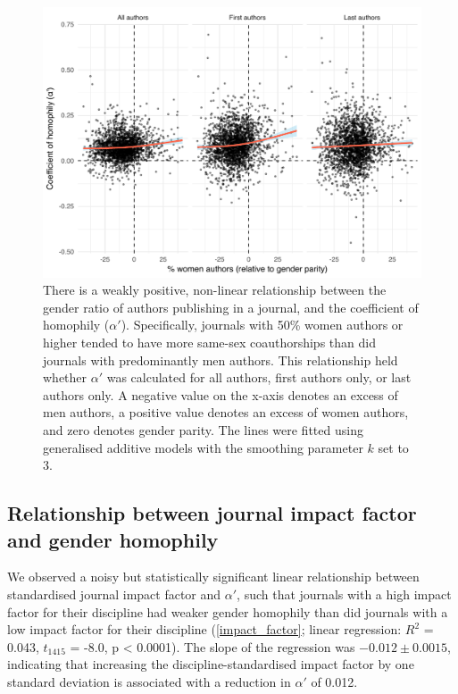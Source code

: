 \documentclass[12pt,]{article}
\begin{document}
\begin{figure}[htbp]
\centering
\includegraphics{../figures/Fig4.pdf}
\caption{There is a weakly positive, non-linear relationship between the
gender ratio of authors publishing in a journal, and the coefficient of
homophily (\(\alpha'\)). Specifically, journals with 50\% women authors
or higher tended to have more same-sex coauthorships than did journals
with predominantly men authors. This relationship held whether
\(\alpha'\) was calculated for all authors, first authors only, or last
authors only. A negative value on the x-axis denotes an excess of men
authors, a positive value denotes an excess of women authors, and zero
denotes gender parity. The lines were fitted using generalised additive
models with the smoothing parameter \(k\) set to 3.
\label{alpha_gender_ratio}}
\end{figure}

\subsection{Relationship between journal impact factor and gender
homophily}\label{relationship-between-journal-impact-factor-and-gender-homophily}

We observed a noisy but statistically significant linear relationship
between standardised journal impact factor and \(\alpha'\), such that
journals with a high impact factor for their discipline had weaker
gender homophily than did journals with a low impact factor for their
discipline (\autoref{impact_factor}; linear regression: \(R^2\) = 0.043,
\(t_{1415}\) = -8.0, p \textless{} 0.0001). The slope of the regression
was \(-0.012{\pm}0.0015\), indicating that increasing the
discipline-standardised impact factor by one standard deviation is
associated with a reduction in \(\alpha'\) of 0.012.
\end{document}
